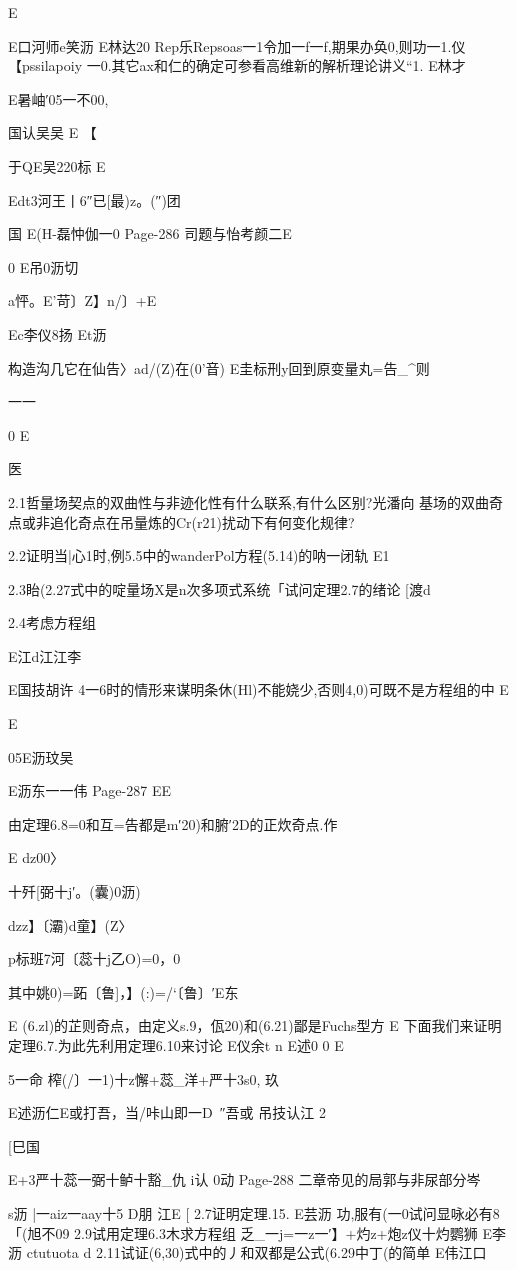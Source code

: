 {{{{{{{{{{{{{{E

E口河师e笑沥
E林达20
Rep乐Repsoas一1令加一f一f,期果办奂0,则功一1.仪
【pssilapoiy
一0.其它ax和仁的确定可参看高维新的解析理论讲义“1.
E林才

E暑岫′05一不00,

国认吴吴
E
【

于QE吴220标
E

Edt3河王丨6″已[最)z。(″)团

国
E(H-磊忡伽一0
Page-286
司题与怡考颜二E

0
E吊0沥切

a怦。E'苛〕Z】n/〕+E

Ec李仪8扬
Et沥

构造沟几它在仙告〉ad/(Z)在(0'音)
E圭标刑y回到原变量丸=告_^则

一一

0
E

医

2.1哲量场契点的双曲性与非迹化性有什么联系,有什么区别?光潘向
基场的双曲奇点或非追化奇点在吊量炼的Cr(r21)扰动下有何变化规律?

2.2证明当|心1时,例5.5中的wanderPol方程(5.14)的呐一闭轨
E1

2.3眙(2.27式中的啶量场X是n次多项式系统「试问定理2.7的绪论
[渡d

2.4考虑方程组

E江d江江李

E国技胡许
4一6时的情形来谋明条休(Hl)不能娆少,否则4,0)可既不是方程组的中
E

E

05E沥玟吴

E沥东一一伟
Page-287
EE

由定理6.8=0和互=告都是m′20)和腑′2D的正炊奇点.作

E
dz00〉

十歼[弼十j′。(囊)0沥)

dzz】〔灞)d童】(Z〉

p标班7河〔蕊十j乙O)=0，0

其中姚0)=跖〔鲁]，】(:)=/`〔鲁〕′E东

E
(6.zl)的芷则奇点，由定义s.9，佤20)和(6.21)鄙是Fuchs型方
E
下面我们来证明定理6.7.为此先利用定理6.10来讨论
E仪余t
n
E述0
0
E

5一命
榨(/〕一1)十z懈+蕊_洋+严十3s0,
玖

E述沥仁E或打吾，当/咔山即一D~″吾或
吊技认江
2

[巳国

E+3严十蕊一弼十鲈十豁_仇
i认
0动
Page-288
二章帝见的局郭与非尿部分岑

s沥
|一aiz一aay十5
D朋
江E
[
2.7证明定理.15.
E芸沥
功,服有(一0试问显咏必有8「(旭不09
2.9试用定理6.3木求方程组
乏_一j=一z一′】+灼z+炮z仪十灼鹦狮
E李沥
ctutuota
d
2.11试证(6,30)式中的丿和双都是公式(6.29中丁(的简单
E伟江口

}}}}}}}}}}}}}}
